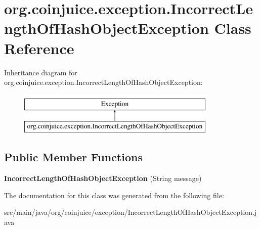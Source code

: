 \hypertarget{classorg_1_1coinjuice_1_1exception_1_1_incorrect_length_of_hash_object_exception}{\section{org.\-coinjuice.\-exception.\-Incorrect\-Length\-Of\-Hash\-Object\-Exception Class Reference}
\label{classorg_1_1coinjuice_1_1exception_1_1_incorrect_length_of_hash_object_exception}
}
Inheritance diagram for org.\-coinjuice.\-exception.\-Incorrect\-Length\-Of\-Hash\-Object\-Exception\-:\begin{figure}[H]
\begin{center}
\leavevmode
\includegraphics[height=2.000000cm]{classorg_1_1coinjuice_1_1exception_1_1_incorrect_length_of_hash_object_exception}
\end{center}
\end{figure}
\subsection*{Public Member Functions}
\begin{DoxyCompactItemize}
\item 
\hypertarget{classorg_1_1coinjuice_1_1exception_1_1_incorrect_length_of_hash_object_exception_ab3ce4653ba0b771ca843b22ad534a119}{{\bfseries Incorrect\-Length\-Of\-Hash\-Object\-Exception} (String message)}\label{classorg_1_1coinjuice_1_1exception_1_1_incorrect_length_of_hash_object_exception_ab3ce4653ba0b771ca843b22ad534a119}

\end{DoxyCompactItemize}


The documentation for this class was generated from the following file\-:\begin{DoxyCompactItemize}
\item 
src/main/java/org/coinjuice/exception/Incorrect\-Length\-Of\-Hash\-Object\-Exception.\-java\end{DoxyCompactItemize}
